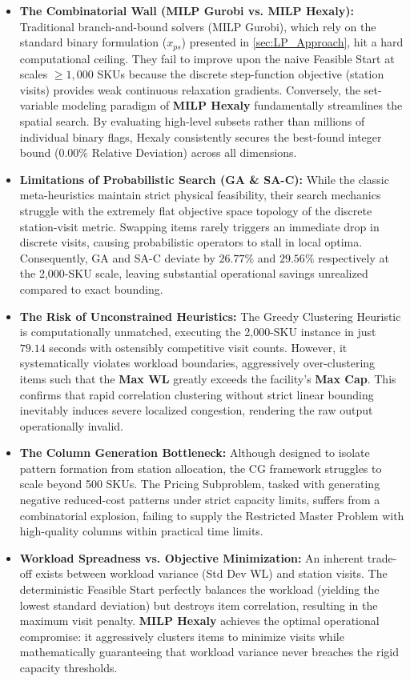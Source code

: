 \documentclass[preprint,review,11pt,authoryear]{elsarticle}
\begin{document}
\begin{itemize} 
\item \textbf{The Combinatorial Wall (MILP Gurobi vs. MILP Hexaly):} 
	Traditional branch-and-bound solvers (MILP Gurobi), which rely on the standard binary formulation ($x_{ps}$) presented in \cref{sec:LP_Approach}, hit a hard computational ceiling. They fail to improve upon the naive Feasible Start at scales $\ge 1,000$ SKUs because the discrete step-function objective (station visits) provides weak continuous relaxation gradients. Conversely, the set-variable modeling paradigm of \textbf{MILP Hexaly} fundamentally streamlines the spatial search. By evaluating high-level subsets rather than millions of individual binary flags, Hexaly consistently secures the best-found integer bound ($0.00\%$ Relative Deviation) across all dimensions.

    \item \textbf{Limitations of Probabilistic Search (GA \& SA-C):}
    While the classic meta-heuristics maintain strict physical feasibility, their search mechanics struggle with the extremely flat objective space topology of the discrete station-visit metric. Swapping items rarely triggers an immediate drop in discrete visits, causing probabilistic operators to stall in local optima. Consequently, GA and SA-C deviate by $26.77\%$ and $29.56\%$ respectively at the 2,000-SKU scale, leaving substantial operational savings unrealized compared to exact bounding.

    \item \textbf{The Risk of Unconstrained Heuristics:} 
    The Greedy Clustering Heuristic is computationally unmatched, executing the 2,000-SKU instance in just $79.14$ seconds with ostensibly competitive visit counts. However, it systematically violates workload boundaries, aggressively over-clustering items such that the \textbf{Max WL} greatly exceeds the facility's \textbf{Max Cap}. This confirms that rapid correlation clustering without strict linear bounding inevitably induces severe localized congestion, rendering the raw output operationally invalid.

    \item \textbf{The Column Generation Bottleneck:}
    Although designed to isolate pattern formation from station allocation, the CG framework struggles to scale beyond 500 SKUs. The Pricing Subproblem, tasked with generating negative reduced-cost patterns under strict capacity limits, suffers from a combinatorial explosion, failing to supply the Restricted Master Problem with high-quality columns within practical time limits.

    \item \textbf{Workload Spreadness vs. Objective Minimization:} 
    An inherent trade-off exists between workload variance (Std Dev WL) and station visits. The deterministic Feasible Start perfectly balances the workload (yielding the lowest standard deviation) but destroys item correlation, resulting in the maximum visit penalty. \textbf{MILP Hexaly} achieves the optimal operational compromise: it aggressively clusters items to minimize visits while mathematically guaranteeing that workload variance never breaches the rigid capacity thresholds.
\end{itemize}
\end{document}
